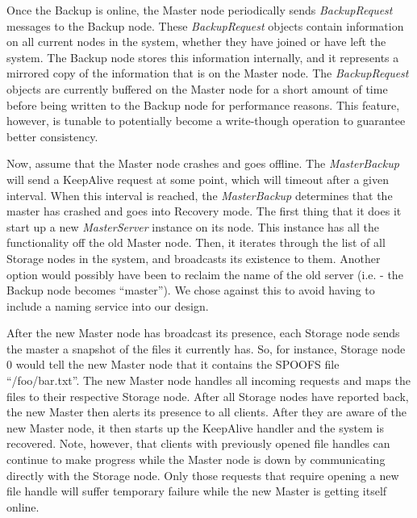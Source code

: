 Once the Backup is online, the Master node periodically sends \textit{BackupRequest} messages to the Backup node.  These \textit{BackupRequest} objects contain information on all current nodes in the system, whether they have joined or have left the system.  The Backup node stores this information internally, and it represents a mirrored copy of the information that is on the Master node.  The \textit{BackupRequest} objects are currently buffered on the Master node for a short amount of time before being written to the Backup node for performance reasons.  This feature, however, is tunable to potentially become a write-though operation to guarantee better consistency.

Now, assume that the Master node crashes and goes offline.  The \textit{MasterBackup} will send a KeepAlive request at some point, which will timeout after a given interval.  When this interval is reached, the \textit{MasterBackup} determines that the master has crashed and goes into Recovery mode.  The first thing that it does it start up a new \textit{MasterServer} instance on its node.  This instance has all the functionality off the old Master node.  Then, it iterates through the list of all Storage nodes in the system, and broadcasts its existence to them.  Another option would possibly have been to reclaim the name of the old server (i.e. - the Backup node becomes ``master'').  We chose against this to avoid having to include a naming service into our design.

After the new Master node has broadcast its presence, each Storage node sends the master a snapshot of the files it currently has.  So, for instance, Storage node 0 would tell the new Master node that it contains the SPOOFS file ``/foo/bar.txt''.  The new Master node handles all incoming requests and maps the files to their respective Storage node.  After all Storage nodes have reported back, the new Master then alerts its presence to all clients.  After they are aware of the new Master node, it then starts up the KeepAlive handler and the system is recovered.  Note, however, that clients with previously opened file handles can continue to make progress while the Master node is down by communicating directly with the Storage node.  Only those requests that require opening a new file handle will suffer temporary failure while the new Master is getting itself online.
